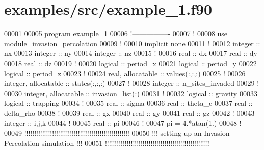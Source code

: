 \hypertarget{example__1_8f90_source}{
\section{examples/src/example\-\_\-1.f90}
}

\begin{DoxyCode}
00001 
\hypertarget{example__1_8f90_source_l00005}{}\hyperlink{example__1_8f90_a33b791e70f7381682d35121a46397153}{00005} \textcolor{keyword}{program} \hyperlink{example__1_8f90_a33b791e70f7381682d35121a46397153}{example_1}
00006 \textcolor{comment}{!----------------}
00007 \textcolor{comment}{!}
00008 use \textcolor{keywordflow}{module\_invasion\_percolation}
00009 \textcolor{comment}{!}
00010 \textcolor{keyword}{implicit none}
00011 \textcolor{comment}{!}
00012 \textcolor{keywordtype}{integer} :: nx
00013 \textcolor{keywordtype}{integer} :: ny
00014 \textcolor{keywordtype}{integer} :: nz
00015 \textcolor{comment}{!}
00016 \textcolor{keywordtype}{real} :: dx 
00017 \textcolor{keywordtype}{real} :: dy 
00018 \textcolor{keywordtype}{real} :: dz 
00019 \textcolor{comment}{!}
00020 \textcolor{keywordtype}{logical} :: period\_x 
00021 \textcolor{keywordtype}{logical} :: period\_y
00022 \textcolor{keywordtype}{logical} :: period\_z 
00023 \textcolor{comment}{!}
00024 \textcolor{keywordtype}{real}, \textcolor{keywordtype}{allocatable} :: values(:,:,:) 
00025 \textcolor{comment}{!}
00026 \textcolor{keywordtype}{integer}, \textcolor{keywordtype}{allocatable} :: states(:,:,:)
00027 \textcolor{comment}{!}
00028 \textcolor{keywordtype}{integer} :: n\_sites\_invaded
00029 \textcolor{comment}{!}
00030 \textcolor{keywordtype}{integer}, \textcolor{keywordtype}{allocatable} :: invasion\_list(:)
00031 \textcolor{comment}{!}
00032 \textcolor{keywordtype}{logical} :: gravity 
00033 \textcolor{keywordtype}{logical} :: trapping 
00034 \textcolor{comment}{!}
00035 \textcolor{keywordtype}{real} :: sigma
00036 \textcolor{keywordtype}{real} :: theta\_c 
00037 \textcolor{keywordtype}{real} :: delta\_rho 
00038 \textcolor{comment}{!}
00039 \textcolor{keywordtype}{real} :: gx
00040 \textcolor{keywordtype}{real} :: gy 
00041 \textcolor{keywordtype}{real} :: gz 
00042 \textcolor{comment}{!}
00043 \textcolor{keywordtype}{integer} :: i,j,k
00044 \textcolor{comment}{!}
00045 \textcolor{keywordtype}{real} :: pi
00046 \textcolor{comment}{!}
00047 pi = 4.*atan(1.)
00048 \textcolor{comment}{!}
00049 \textcolor{comment}{!!!!!!!!!!!!!!!!!!!!!!!!!!!!!!!!!!!!!!!!!!!!!!!!!!!!!}
00050 \textcolor{comment}{!!! setting up an Invasion Percolation simulation !!!}
00051 \textcolor{comment}{!!!!!!!!!!!!!!!!!!!!!!!!!!!!!!!!!!!!!!!!!!!!!!!!!!!!!}

\end{DoxyCode}
